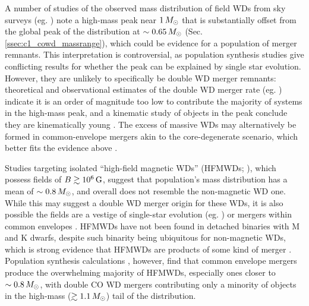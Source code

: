 

A number of studies of the observed mass distribution of field WDs from sky surveys (eg. \citealt{liebbh05, giambd12, klei+13, reba+15a, reba+15b}) note a high-mass peak near $1\,\Msun$ that is substantially offset from the global peak of the distribution at $\sim0.65\,\Msun$ (Sec. \ref{ssec:c1_cowd_massrange}), which could be evidence for a population of merger remnants.  This interpretation is controversial, as population synthesis studies \citep{reba+15a, trem+16} give conflicting results for whether the peak can be explained by single star evolution.  However, they are unlikely to specifically be double WD merger remnants: theoretical and observational estimates of the double WD merger rate (eg. \citealt{badem12, toonnp12}) indicate it is an order of magnitude too low \citep{trem+16} to contribute the majority of systems in the high-mass peak, and a kinematic study of objects in the peak conclude they are kinematically young \citep{weggp12}.  The excess of massive WDs may alternatively be formed in common-envelope mergers akin to the core-degenerate scenario, which better fits the evidence above \citep{reba+15b, brig+15}.



Studies targeting isolated ``high-field magnetic WDs'' (HFMWDs; \citealt{kepl+13, garc+16}), which possess fields of $B \gtrsim10^6\,\mathrm{G}$, suggest that population's mass distribution has a mean of $\sim0.8\,\Msun$, and overall does not resemble the non-magnetic WD one.  While this may suggest a double WD merger origin for these WDs, it is also possible the fields are a vestige of single-star evolution (eg. \citealt{wickf05, kisst15}) or mergers within common envelopes \citep{garc+12, wicktf14, brig+15}.  HFMWDs have not been found in detached binaries with M and K dwarfs, despite such binarity being ubiquitous for non-magnetic WDs, which is strong evidence that HFMWDs are products of some kind of merger \citep{lieb+15, ferrdg15}.  Population synthesis calculations \citep{garc+12, brig+15}, however, find that common envelope mergers produce the overwhelming majority of HFMWDs, especially ones closer to $\sim0.8\,\Msun$, with double CO WD mergers contributing only a minority of objects in the high-mass ($\gtrsim1.1\,\Msun$) tail of the distribution.

